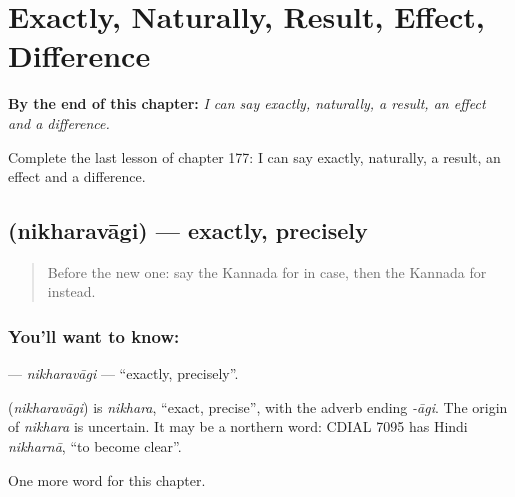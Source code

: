 
\chapter{Exactly, Naturally, Result, Effect, Difference}
\label{ch:ka-exactly-naturally-result-effect-difference}

\begin{chapteropening}
\textbf{By the end of this chapter:} \emph{I can say exactly, naturally, a result, an effect and a difference.}

Complete the last lesson of chapter 177: I can say exactly, naturally, a result, an effect and a difference.
\end{chapteropening}

\section[\texorpdfstring{\kn{ನಿಖರವಾಗಿ} (nikharavāgi)}{ನಿಖರವಾಗಿ (nikharavāgi)}]{ (nikharavāgi) — exactly, precisely}

\label{lesson:KA-C177-nikharavagi}



\begin{quote}
Before the new one: say the Kannada for in case, then the Kannada for instead.
\end{quote}

\subsection*{You'll want to know: }
\textbf{} — \emph{nikharavāgi} — \textquotedblleft{}exactly, precisely\textquotedblright{}.

\begin{cousinweb}
\textbf{} (\emph{nikharavāgi}) is \emph{nikhara}, \textquotedblleft{}exact, precise\textquotedblright{}, with the adverb ending \emph{-āgi}. The origin of \emph{nikhara} is uncertain. It may be a northern word: CDIAL 7095 has Hindi \emph{nikharnā}, \textquotedblleft{}to become clear\textquotedblright{}.
\end{cousinweb}

\begin{grammarlens}[title={What you've built}]
One more word for this chapter.
\end{grammarlens}

